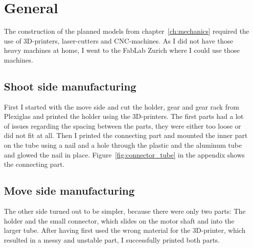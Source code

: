 \section{General}\label{sec:general3}
The construction of the planned models from chapter~\ref{ch:mechanics} required the use of 3D-printers, laser-cutters and CNC-machines.
As I did not have those heavy machines at home, I went to the FabLab Zurich\autocite{fablab} where I could use those machines.

\subsection{Shoot side manufacturing}\label{subsec:turn-side-manufacturing}
First I started with the move side and cut the holder, gear and gear rack from Plexiglas and printed the holder using the 3D-printers.
The first parts had a lot of issues regarding the spacing between the parts, they were either too loose or did not fit at all.
Then I printed the connecting part and mounted the inner part on the tube using a nail and a hole through the plastic and the aluminum tube and glowed the nail in place.
Figure~\ref{fig:connector_tube} in the appendix shows the connecting part.

\subsection{Move side manufacturing}\label{subsec:move-side-manufacturing}
The other side turned out to be simpler, because there were only two parts: The holder and the small connector, which slides on the motor shaft and into the larger tube.
After having first used the wrong material for the 3D-printer, which resulted in a messy and unstable part, I successfully printed both parts.

